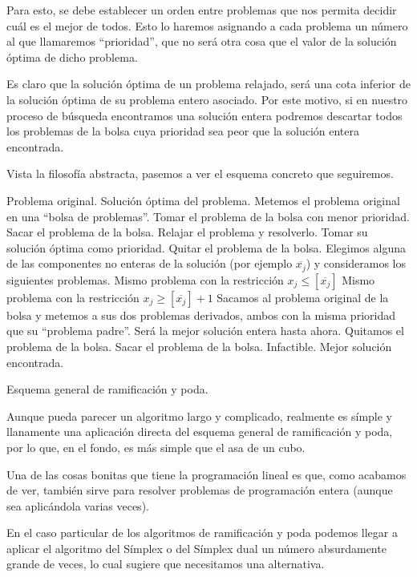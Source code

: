 Para esto, se debe establecer un orden entre problemas que nos permita decidir cuál es el mejor de todos. Esto lo haremos asignando a cada problema un número al que llamaremos ``prioridad'', que no será otra cosa que el valor de la solución óptima de dicho problema.

Es claro que la solución óptima de un problema relajado, será una cota inferior de la solución óptima de su problema entero asociado. Por este motivo, si en nuestro proceso de búsqueda encontramos una solución entera podremos descartar todos los problemas de la bolsa cuya prioridad sea peor que la solución entera encontrada.

Vista la filosofía abstracta, pasemos a ver el esquema concreto que seguiremos.
\begin{algorithm}[H]
	\begin{algorithmic}[1]
		\REQUIRE Problema original.
		\ENSURE Solución óptima del problema.
		\STATE Metemos el problema original en una ``bolsa de problemas''.
		\STATE Tomar el problema de la bolsa con menor prioridad.
		\STATE Sacar el problema de la bolsa.
		\ELSE
		\STATE Relajar el problema y resolverlo.
		\STATE Tomar su solución óptima como prioridad.
		\STATE Quitar el problema de la bolsa.
		\STATE Elegimos alguna de las componentes no enteras de la solución (por ejemplo $\overline{x_j}$) y consideramos los siguientes problemas.
		\STATE Mismo problema con la restricción $x_j\leq[\overline{x_j}]$
		\STATE Mismo problema con la restricción $x_j\geq[\overline{x_j}]+1$
		\STATE Sacamos al problema original de la bolsa y metemos a sus dos problemas derivados, ambos con la misma prioridad que su ``problema padre''.
		\STATE Será la mejor solución entera hasta ahora.
		\STATE Quitamos el problema de la bolsa.
		\ENDIF
		\ELSE
		\STATE Sacar el problema de la bolsa.
		\ENDIF
		\ENDIF
		\ENDWHILE
		\RETURN Infactible.
		\ELSE \RETURN Mejor solución encontrada.
		\ENDIF
	\end{algorithmic}
	\caption{Esquema general de ramificación y poda.}\label{ent_alg_poda}
\end{algorithm}
Aunque pueda parecer un algoritmo largo y complicado, realmente es símple y llanamente una aplicación directa del esquema general de ramificación y poda, por lo que, en el fondo, es más simple que el asa de un cubo.
\begin{obs}[Complejidad]
	Una de las cosas bonitas que tiene la programación lineal es que, como acabamos de ver, también sirve para resolver problemas de programación entera (aunque sea aplicándola varias veces).
	
	En el caso particular de los algoritmos de ramificación y poda podemos llegar a aplicar el algoritmo del Símplex o del Símplex dual un número absurdamente grande de veces, lo cual sugiere que necesitamos una alternativa.
\end{obs}
